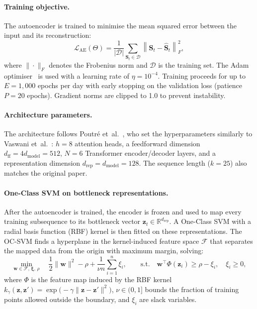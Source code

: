 \documentclass[11pt]{report}
\begin{document}
\paragraph{Training objective.}
The autoencoder is trained to minimise the mean squared error between the input and its reconstruction:
\begin{equation}
  \label{eq:ae_loss}
  \mathcal{L}_{\text{AE}}(\Theta) = \frac{1}{|\mathcal{D}|} \sum_{\mathbf{S}_t \in \mathcal{D}} \left\| \mathbf{S}_t - \hat{\mathbf{S}}_t \right\|_F^2,
\end{equation}
where $\|\cdot\|_F$ denotes the Frobenius norm and $\mathcal{D}$ is the training set. The Adam optimiser~\cite{kingma2014adam} is used with a learning rate of $\eta = 10^{-4}$. Training proceeds for up to $E = 1{,}000$ epochs per day with early stopping on the validation loss (patience $P = 20$ epochs). Gradient norms are clipped to 1.0 to prevent instability.

\paragraph{Architecture parameters.}
The architecture follows Poutr\'e et~al.~\cite{poutre_2024}, who set the hyperparameters similarly to Vaswani et~al.~\cite{vaswani2017attention}: $h = 8$ attention heads, a feedforward dimension $d_{\text{ff}} = 4d_{\text{model}} = 512$, $N = 6$ Transformer encoder/decoder layers, and a representation dimension $d_{\text{rep}} = d_{\text{model}} = 128$. The sequence length ($k = 25$) also matches the original paper.

\paragraph{One-Class SVM on bottleneck representations.}
After the autoencoder is trained, the encoder is frozen and used to map every training subsequence to its bottleneck vector $\mathbf{z}_t \in \mathbb{R}^{d_{\text{rep}}}$. A One-Class SVM with a radial basis function (RBF) kernel is then fitted on these representations. The OC-SVM finds a hyperplane in the kernel-induced feature space $\mathcal{F}$ that separates the mapped data from the origin with maximum margin, solving:
\begin{equation}
  \label{eq:ocsvm}
  \min_{\mathbf{w} \in \mathcal{F},\, \boldsymbol{\xi},\, \rho} \quad \frac{1}{2}\|\mathbf{w}\|^2 - \rho + \frac{1}{\nu n} \sum_{i=1}^{n} \xi_i, \qquad \text{s.t.} \quad \mathbf{w}^\top \Phi(\mathbf{z}_i) \geq \rho - \xi_i, \quad \xi_i \geq 0,
\end{equation}
where $\Phi$ is the feature map induced by the RBF kernel $k_\gamma(\mathbf{z}, \mathbf{z}') = \exp\!\bigl(-\gamma \|\mathbf{z} - \mathbf{z}'\|^2\bigr)$, $\nu \in (0, 1]$ bounds the fraction of training points allowed outside the boundary, and $\xi_i$ are slack variables.
\end{document}

